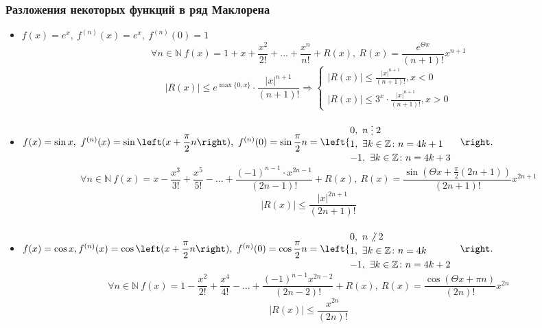 \subsubsection{Разложения некоторых функций в ряд Маклорена}
\begin{itemize}
	\item $f(x) = e^x, \
	f^{(n)}(x) = e^x, \
	f^{(n)}(0) = 1$
	\begin{equation*}
	\forall n \in \mathbb N \ f(x) = 1 + x + \frac{x^2}{2!} + \ldots + \frac{x^n}{n!} + R(x), \
	R(x) = \frac{e^{\Theta x}}{(n + 1)!} x^{n + 1}
	\end{equation*}
	\begin{equation*}
	|R(x)| \leqslant e^{\max \{ 0, x \}} \cdot \frac{|x|^{n + 1}}{(n + 1)!} \Rightarrow
	\begin{cases}
	\displaystyle |R(x)| \leqslant \frac{|x|^{n + 1}}{(n + 1)!}, x < 0 \\
	\displaystyle |R(x)| \leqslant 3^x \cdot \frac{|x|^{n + 1}}{(n + 1)!}, x > 0
	\end{cases}
	\end{equation*}
	
	\item $f(x) = \sin x, \
	f^{(n)}(x) = \sin \left( x + \dfrac\pi{2} n \right), \
	f^{(n)}(0) = \sin \dfrac\pi{2} n =
	\begin{cases}
	0, \ n \mult 2 \\
	1, \ \exists k \in \mathbb Z \colon n = 4k + 1 \\
	-1, \ \exists k \in \mathbb Z \colon n = 4k + 3
	\end{cases}$
	\begin{equation*}
	\forall n \in \mathbb N \ f(x) = x - \frac{x^3}{3!} + \frac{x^5}{5!} - \ldots + \frac{(-1)^{n-1} \cdot x^{2n-1}}{(2n - 1)!} + R(x), \
	R(x) = \frac{\sin \left( \Theta x + \frac\pi{2} (2n + 1) \right)}{(2n + 1)!} x^{2n+1}
	\end{equation*}
	\begin{equation*}
	|R(x)| \leqslant \frac{|x|^{2n+1}}{(2n + 1)!}
	\end{equation*}
	
	\item $f(x) = \cos x,
	f^{(n)}(x) = \cos \left( x + \dfrac\pi{2} n \right), \
	f^{(n)}(0) = \cos \dfrac\pi{2} n =
	\begin{cases}
	0, \ n \notmult 2 \\
	1, \ \exists k \in \mathbb Z \colon n = 4k \\
	-1, \ \exists k \in \mathbb Z \colon n = 4k + 2
	\end{cases}$
	\begin{equation*}
	\forall n \in \mathbb N \ f(x) = 1 - \frac{x^2}{2!} + \frac{x^4}{4!} - \ldots + \frac{(-1)^{n-1} x^{2n-2}}{(2n - 2)!} + R(x), \
	R(x) = \frac{\cos (\Theta x + \pi n)}{(2n)!} x^{2n}
	\end{equation*}
	\begin{equation*}
	|R(x)| \leqslant \frac{x^{2n}}{(2n)!}
	\end{equation*}
	

\end{itemize}
